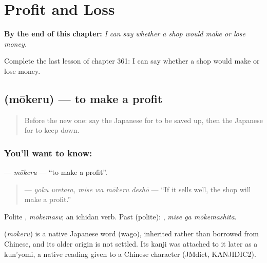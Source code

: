 
\chapter{Profit and Loss}
\label{ch:ja-profit-and-loss}

\begin{chapteropening}
\textbf{By the end of this chapter:} \emph{I can say whether a shop would make or lose money.}

Complete the last lesson of chapter 361: I can say whether a shop would make or lose money.
\end{chapteropening}

\section[\texorpdfstring{\ja{もうける} (mōkeru)}{もうける (mōkeru)}]{ (mōkeru) — to make a profit}

\label{lesson:JA-C361-moukeru}



\begin{quote}
Before the new one: say the Japanese for to be saved up, then the Japanese for to keep down.
\end{quote}

\subsection*{You'll want to know: }
\textbf{} — \emph{mōkeru} — \textquotedblleft{}to make a profit\textquotedblright{}.

\begin{quote}
\textbf{  } — \emph{yoku uretara, mise wa mōkeru deshō} — \textquotedblleft{}If it sells well, the shop will make a profit.\textquotedblright{}
\end{quote}

Polite \textbf{}, \emph{mōkemasu}; an ichidan verb. Past (polite): \textbf{ }, \emph{mise ga mōkemashita}.

\begin{cousinweb}
\textbf{} (\emph{mōkeru}) is a native Japanese word (wago), inherited rather than borrowed from Chinese, and its older origin is not settled. Its kanji was attached to it later as a kun'yomi, a native reading given to a Chinese character (JMdict, KANJIDIC2).
\end{cousinweb}


